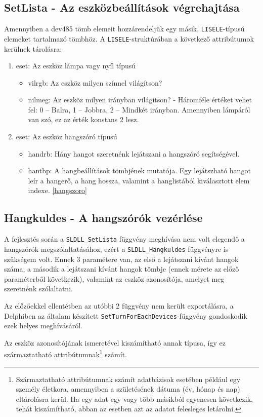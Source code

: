 \documentclass[tocnopagenum]{thesis-ekf}
\theoremstyle{definition}
\theoremstyle{remark}
\begin{document}
	\subsection{SetLista - Az eszközbeállítások végrehajtása}
	Amennyiben a dev485 tömb elemeit hozzárendeljük egy másik, \verb*|LISELE|-típusú elemeket tartalmazó tömbhöz. A \verb*|LISELE|-struktúrában a következő attribútumok kerülnek tárolásra: 
	\begin{enumerate}
		\item eset: Az eszköz lámpa vagy nyíl típusú
		\begin{itemize}
			\item vilrgb: Az eszköz milyen színnel világítson?
			\item nilmeg: Az eszköz milyen irányban világítson? - Háromféle értéket vehet fel: 0 -- Balra, 1 -- Jobbra, 2 -- Mindkét irányban. Amennyiben lámpáról van szó, ez az érték konstans 2 lesz.
		\end{itemize}
		\item eset: Az eszköz hangszóró típusú
		\begin{itemize}
			\item handrb: Hány hangot szeretnénk lejátszani a hangszóró segítségével.
			\item hantbp: A hangbeállítások tömbjének mutatója. Egy lejátszható hangot leír a hangerő, a hang hossza, valamint a hanglistából kiválasztott elem indexe. \ref{hangszoro}
		\end{itemize}
	\end{enumerate}
	\subsection{Hangkuldes - A hangszórók vezérlése}
	A fejlesztés során a \verb*|SLDLL_SetLista| függvény meghívása nem volt elegendő a hangszórók megszólaltatásához, ezért a \verb*|SLDLL_Hangkuldes| függvényre is szükségem volt. Ennek 3 paramétere van, az első a lejátszani kívánt hangok száma, a második a lejátszani kívánt hangok tömbje (ennek mérete az előző paraméterből következik), valamint az eszköz azonosítója, amelyet meg szeretnénk szólaltatni.
	
	Az előzőekkel ellentétben az utóbbi 2 függvény nem került exportálásra, a Delphiben az általam készített \verb*|SetTurnForEachDevices|-függvény gondoskodik ezek helyes meghívásáról.
	
	Az eszköz azonosítójának ismeretével kiszámítható annak típusa, így ez származtatható attribútumnak\footnote{Származtatható attribútumnak számít adatbázisok esetében például egy személy életkora, amennyiben a születésének dátuma (év, hónap és nap) eltárolásra kerül. Ha egy adat egy vagy több másikból egyenesen következik, tehát kiszámítható, abban az esetben azt az adatot felesleges letárolni.} számít.
\end{document}
